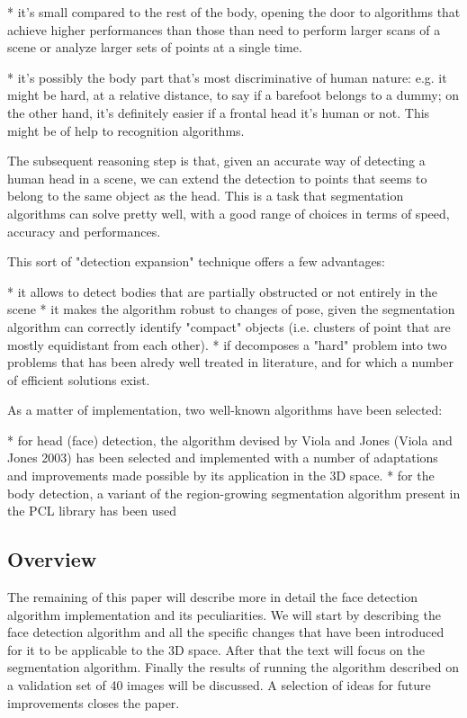 \documentclass[a4paper,12pt,titlepage]{article}
\begin{document}
* it's small compared to the rest of the body, opening the door to algorithms
  that achieve higher performances than those than need to perform larger scans
  of a scene or analyze larger sets of points at a single time.

* it's possibly the body part that's most discriminative of human nature: e.g.
  it might be hard, at a relative distance, to say if a barefoot belongs to a
  dummy; on the other hand, it's definitely easier if a frontal head it's human
  or not. This might be of help to recognition algorithms.

The subsequent reasoning step is that, given an accurate way of detecting a
human head in a scene, we can extend the detection to points that seems to
belong to the same object as the head. This is a task that segmentation
algorithms can solve pretty well, with a good range of choices in terms of
speed, accuracy and performances.

This sort of "detection expansion" technique offers a few advantages:

* it allows to detect bodies that are partially obstructed or not entirely in
  the scene
* it makes the algorithm robust to changes of pose, given the segmentation
  algorithm can correctly identify "compact" objects (i.e. clusters of point
  that are mostly equidistant from each other).
* if decomposes a "hard" problem into two problems that has been alredy well
  treated in literature, and for which a number of efficient solutions exist.

As a matter of implementation, two well-known algorithms have been selected:

* for head (face) detection, the algorithm devised by Viola and Jones (Viola and
  Jones 2003) has been selected and implemented with a number of adaptations and
  improvements made possible by its application in the 3D space.
* for the body detection, a variant of the region-growing segmentation algorithm
  present in the PCL library has been used

\subsection*{Overview}
The remaining of this paper will describe more in detail the face detection
algorithm implementation and its peculiarities. We will start by describing the
face detection algorithm and all the specific changes that have been introduced
for it to be applicable to the 3D space. After that the text will focus on the
segmentation algorithm. Finally the results of running the algorithm described
on a validation set of 40 images will be discussed. A selection of ideas for
future improvements closes the paper.
\end{document}
